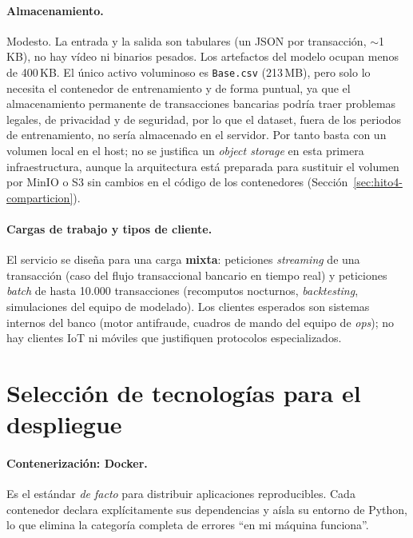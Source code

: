 \documentclass[12pt,a4paper]{report}
\begin{document}
\paragraph{Almacenamiento.} Modesto. La entrada y la salida son tabulares (un JSON por transacción, $\sim$1\,KB), no hay vídeo ni binarios pesados. Los artefactos del modelo ocupan menos de 400\,KB. El único activo voluminoso es \texttt{Base.csv} (213\,MB), pero solo lo necesita el contenedor de entrenamiento y de forma puntual, ya que el almacenamiento permanente de transacciones bancarias podría traer problemas legales, de privacidad y de seguridad, por lo que el dataset, fuera de los periodos de entrenamiento, no sería almacenado en el servidor. Por tanto basta con un volumen local en el host; no se justifica un \textit{object storage} en esta primera infraestructura, aunque la arquitectura está preparada para sustituir el volumen por MinIO o S3 sin cambios en el código de los contenedores (Sección~\ref{sec:hito4-comparticion}).

\paragraph{Cargas de trabajo y tipos de cliente.} El servicio se diseña para una carga \textbf{mixta}: peticiones \textit{streaming} de una transacción (caso del flujo transaccional bancario en tiempo real) y peticiones \textit{batch} de hasta 10.000 transacciones (recomputos nocturnos, \textit{backtesting}, simulaciones del equipo de modelado). Los clientes esperados son sistemas internos del banco (motor antifraude, cuadros de mando del equipo de \textit{ops}); no hay clientes IoT ni móviles que justifiquen protocolos especializados.

\section{Selección de tecnologías para el despliegue}
\label{sec:hito4-tecnologias}

\paragraph{Contenerización: Docker.} Es el estándar \textit{de facto} para distribuir aplicaciones reproducibles. Cada contenedor declara explícitamente sus dependencias y aísla su entorno de Python, lo que elimina la categoría completa de errores ``en mi máquina funciona''.
\end{document}
